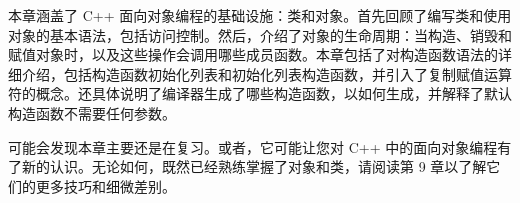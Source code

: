 本章涵盖了 C++ 面向对象编程的基础设施：类和对象。首先回顾了编写类和使用对象的基本语法，包括访问控制。然后，介绍了对象的生命周期：当构造、销毁和赋值对象时，以及这些操作会调用哪些成员函数。本章包括了对构造函数语法的详细介绍，包括构造函数初始化列表和初始化列表构造函数，并引入了复制赋值运算符的概念。还具体说明了编译器生成了哪些构造函数，以如何生成，并解释了默认构造函数不需要任何参数。

可能会发现本章主要还是在复习。或者，它可能让您对 C++ 中的面向对象编程有了新的认识。无论如何，既然已经熟练掌握了对象和类，请阅读第 9 章以了解它们的更多技巧和细微差别。